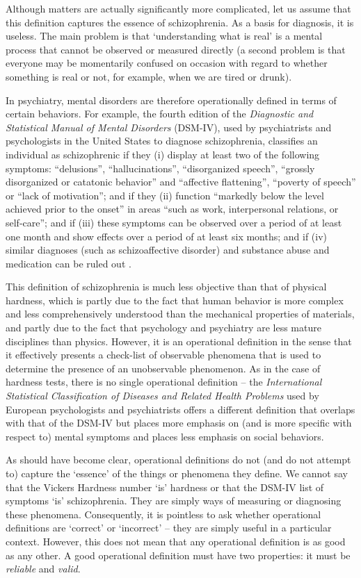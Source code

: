 Although matters are actually significantly more complicated, let us assume that this definition captures the essence of schizophrenia. As a basis for diagnosis, it is useless. The main problem is that `understanding what is real' is a mental process that cannot be observed or measured directly (a second problem is that everyone may be momentarily confused on occasion with regard to whether something is real or not, for example, when we are tired or drunk).

In psychiatry, mental disorders are therefore operationally defined in terms of certain behaviors. For example, the fourth edition of the \emph{Diagnostic and Statistical Manual of Mental Disorders} (DSM-IV), used by psychiatrists and psychologists in the United States to diagnose schizophrenia, classifies an individual as schizophrenic if they (i) display at least two of the following symptoms: ``delusions'', ``hallucinations'', ``disorganized speech'', ``grossly disorganized or catatonic behavior'' and ``affective flattening'', ``poverty of speech'' or ``lack of motivation''; and if they (ii) function ``markedly below the level achieved prior to the onset'' in areas ``such as work, interpersonal relations, or self-care''; and if (iii) these symptoms can be observed over a period of at least one month and show effects over a period of at least six months; and if (iv) similar diagnoses (such as schizoaffective disorder) and substance abuse and medication can be ruled out \citep{american_psychiatric_association_diagnostic_2000}.

This definition of schizophrenia is much less objective than that of physical hardness, which is partly due to the fact that human behavior is more complex and less comprehensively understood than the mechanical properties of materials, and partly due to the fact that psychology and psychiatry are less mature disciplines than physics. However, it is an operational definition in the sense that it effectively presents a check-list of observable phenomena that is used to determine the presence of an unobservable phenomenon. As in the case of hardness tests, there is no single operational definition -- the \emph{International Statistical Classification of Diseases and Related Health Problems} used by European psychologists and psychiatrists offers a different definition that overlaps with that of the DSM-IV but places more emphasis on (and is more specific with respect to) mental symptoms and places less emphasis on social behaviors.

As should have become clear, operational definitions do not (and do not attempt to) capture the `essence' of the things or phenomena they define. We cannot say that the Vickers Hardness number `is' hardness or that the DSM-IV list of symptoms `is' schizophrenia. They are simply ways of measuring or diagnosing these phenomena. Consequently, it is pointless to ask whether operational definitions are `correct' or `incorrect' -- they are simply useful in a particular context. However, this does not mean that any operational definition is as good as any other. A good operational definition must have two properties: it must be \emph{reliable} and \emph{valid}.

